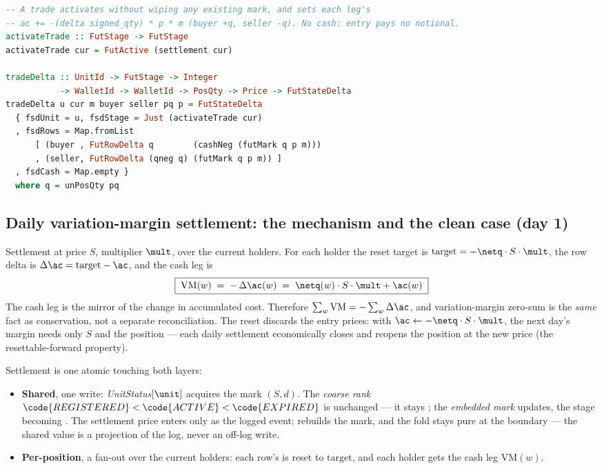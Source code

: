 \documentclass[11pt,a4paper]{article}
\begin{document}
\begin{lstlisting}[language=Haskell]
-- A trade activates without wiping any existing mark, and sets each leg's
-- ac += -(delta signed_qty) * p * m (buyer +q, seller -q). No cash: entry pays no notional.
activateTrade :: FutStage -> FutStage
activateTrade cur = FutActive (settlement cur)

tradeDelta :: UnitId -> FutStage -> Integer
           -> WalletId -> WalletId -> PosQty -> Price -> FutStateDelta
tradeDelta u cur m buyer seller pq p = FutStateDelta
  { fsdUnit = u, fsdStage = Just (activateTrade cur)
  , fsdRows = Map.fromList
      [ (buyer , FutRowDelta q        (cashNeg (futMark q p m)))
      , (seller, FutRowDelta (qneg q) (futMark q p m)) ]
  , fsdCash = Map.empty }
  where q = unPosQty pq
\end{lstlisting}

\subsection{Daily variation-margin settlement: the mechanism and the clean case (day 1)}
\label{sec:settle-mech}

Settlement at price $S$, multiplier $\mult$, over the current holders. For each holder the reset
target is $\mathrm{target}=-\netq\cdot S\cdot\mult$, the row delta is $\Delta\ac=\mathrm{target}-\ac$,
and the cash leg is
\[
\boxed{\;\mathrm{VM}(w) \;=\; -\,\Delta\ac(w) \;=\; \netq(w)\cdot S\cdot \mult + \ac(w)\;}
\]
The cash leg is the mirror of the change in accumulated cost. Therefore
$\sum_w\mathrm{VM} = -\sum_w\Delta\ac$, and variation-margin zero-sum is the \emph{same} fact as \ac{}
conservation, not a separate reconciliation. The reset discards the entry prices: with
$\ac\leftarrow-\netq\cdot S\cdot\mult$, the next day's margin needs only $S$ and the position --- each
daily settlement economically closes and reopens the position at the new price (the resettable-forward
property).

Settlement is one atomic  touching both layers:
\begin{itemize}
\item \textbf{Shared}, one write: \emph{UnitStatus}$[\unit]$ acquires the mark $(S,d)$. The
\emph{coarse rank} $\code{REGISTERED}<\code{ACTIVE}<\code{EXPIRED}$ is unchanged --- it stays
; the \emph{embedded mark} updates, the stage becoming
. The settlement price enters only as the logged
 event;  rebuilds the mark, and the fold stays pure at the boundary --- the
shared value is a projection of the log, never an off-log write.
\item \textbf{Per-position}, a fan-out over the current holders: each row's \ac{} is reset to
$\mathrm{target}$, and each holder gets the cash leg $\mathrm{VM}(w)$.
\end{itemize}
\end{document}
